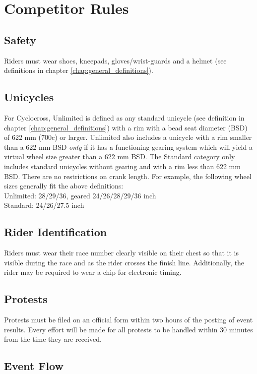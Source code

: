 \chapter{Competitor Rules}

\section{Safety}
Riders must wear shoes, kneepads, gloves/wrist-guards and a helmet (see definitions in chapter \ref{chap:general_definitions}).

\section{Unicycles}

For Cyclocross, Unlimited is defined as any standard unicycle (see definition in chapter \ref{chap:general_definitions}) with a rim with a bead seat diameter (BSD) of 622 mm (700c) or larger.
Unlimited also includes a unicycle with a rim smaller than a 622 mm BSD {\em only} if it has a functioning gearing system which will yield a virtual wheel size greater than a 622 mm BSD.
The Standard category only includes standard unicycles without gearing and with a rim less than 622 mm BSD.
There are no restrictions on crank length.
For example, the following wheel sizes generally fit the above definitions: \\
Unlimited: 28/29/36, geared 24/26/28/29/36 inch \\
Standard: 24/26/27.5 inch


\section{Rider Identification}

Riders must wear their race number clearly visible on their chest so that it is visible during the race and as the rider crosses the finish line.
Additionally, the rider may be required to wear a chip for electronic timing.

\section{Protests}

Protests must be filed on an official form within two hours of the posting of event results.
Every effort will be made for all protests to be handled within 30 minutes from the time they are received.

\section{Event Flow}

